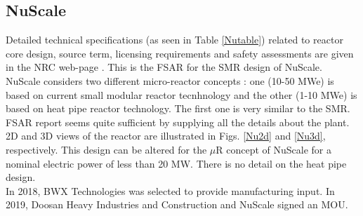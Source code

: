 \documentclass[10pt,a4paper]{article}
\begin{document}
\subsection{NuScale}
Detailed technical specifications (as seen in Table \ref{Nutable}) related to reactor core design, source term, licensing requirements and safety assessments are given in the NRC web-page \cite{NuChapter19}. This is the FSAR for the SMR design of NuScale. NuScale considers two different micro-reactor concepts \cite{nichol19}: one (10-50 MWe) is based on current small modular reactor tecnhnology and the other (1-10 MWe) is based on heat pipe reactor technology. The first one is very similar to the SMR. FSAR report  seems quite sufficient by supplying all the details about the plant. 2D and 3D views of the reactor are illustrated in Figs. \ref{Nu2d} and \ref{Nu3d}, respectively. This design can be altered for the $\mu$R concept of NuScale for a nominal electric power of less than 20 MW. There is no detail on the heat pipe design.  \\
In 2018, BWX Technologies was selected to provide manufacturing input. In 2019, Doosan Heavy Industries and Construction and NuScale signed an MOU. 
\end{document}
